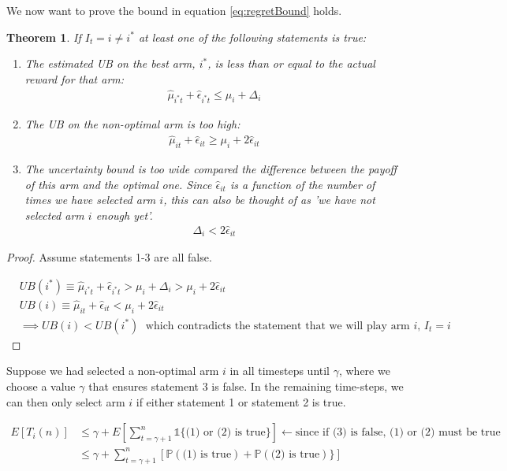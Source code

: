 \documentclass{article}
\newcommand{\eqn}[1]{\begin{align}#1\end{align}}
\newcommand{\eq}[1]{\begin{align*}#1\end{align*}}
\theoremstyle{plain}
\newtheorem{theorem}{Theorem}
\theoremstyle{definition}
\begin{document}
We now want to prove the bound in equation \ref{eq:regretBound} holds.

\begin{theorem} If $I_t = i \neq i^*$ at least one of the following statements is true:
\begin{enumerate}
\item The estimated UB on the best arm, $i^*$, is less than or equal to the actual reward for that arm:
\eq{
\hat{\mu}_{i^*t} + \hat{\epsilon}_{i^*t} \leq \mu_i+\Delta_i
}
\item The UB on the non-optimal arm is too high: 
\eqn{
\hat \mu_{it}+ \hat \epsilon_{it} \geq \mu_i + 2 \hat \epsilon_{it}
}
\item The uncertainty bound is too wide compared the difference between the payoff of this arm and the optimal one. Since $\hat{\epsilon}_{it}$ is a function of the number of times we have selected arm $i$, this can also be thought of as 'we have not selected arm $i$ enough yet'. 
\eqn{
\Delta_i < 2\hat{\epsilon}_{it}  
}
\end{enumerate}
\end{theorem}
\begin{proof}
Assume statements 1-3 are all false.


\eq{
& UB(i^*) \equiv \hat{\mu}_{i^*t} + \hat{\epsilon}_{i^*t} >  \mu_i+\Delta_i > \mu_i+2\hat{\epsilon}_{it} \\
& UB(i)\equiv \hat{\mu}_{it} + \hat{\epsilon}_{it} < \mu_i+2\hat{\epsilon}_{it}\\
& \implies UB(i) < UB(i^*) \; \text{ which contradicts the statement that we will play arm $i$, $I_t = i$}
}


\end{proof}

Suppose we had selected a non-optimal arm $i$ in all timesteps until $\gamma$, where we choose a value $\gamma$ that ensures statement 3 is false. In the remaining time-steps, we can then only select arm $i$ if either statement 1 or statement 2 is true.

 

\eq{
E\left[T_{i}(n)\right] & \leq \gamma + E\left[\sum_{t=\gamma+1}^{n} \mathds{1} \{\text{(1) or (2) is true} \}\right] \leftarrow \text{since if (3) is false, (1) or (2) must be true}\\[3pt]
& \leq \gamma + \sum_{t=\gamma+1}^{n} \left[ \mathds{P}(\text{(1) is true}) + \mathds{P}(\text{(2) is true})  \}\right]
}
\end{document}
